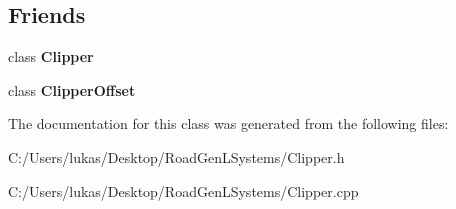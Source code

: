 \subsection*{Friends}
\begin{DoxyCompactItemize}
\item 
\hypertarget{class_clipper_lib_1_1_poly_node_a4d39a09ecdddeeb85930dd4554a54b3c}{}\label{class_clipper_lib_1_1_poly_node_a4d39a09ecdddeeb85930dd4554a54b3c} 
class {\bfseries Clipper}
\item 
\hypertarget{class_clipper_lib_1_1_poly_node_adadfb8ac9a17a5c8fb7b4f012075b975}{}\label{class_clipper_lib_1_1_poly_node_adadfb8ac9a17a5c8fb7b4f012075b975} 
class {\bfseries Clipper\+Offset}
\end{DoxyCompactItemize}


The documentation for this class was generated from the following files\+:\begin{DoxyCompactItemize}
\item 
C\+:/\+Users/lukas/\+Desktop/\+Road\+Gen\+L\+Systems/Clipper.\+h\item 
C\+:/\+Users/lukas/\+Desktop/\+Road\+Gen\+L\+Systems/Clipper.\+cpp\end{DoxyCompactItemize}
